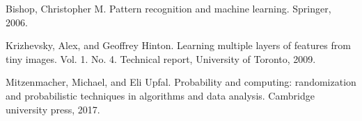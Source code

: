 \documentclass[12pt]{article}
\begin{document}
\begin{thebibliography}{1}
    Bishop, Christopher M. Pattern recognition and machine learning. Springer, 2006.

    Krizhevsky, Alex, and Geoffrey Hinton. Learning multiple layers of features from tiny images. Vol. 1. No. 4. Technical report, University of Toronto, 2009.

    Mitzenmacher, Michael, and Eli Upfal. Probability and computing: randomization and probabilistic techniques in algorithms and data analysis. Cambridge university press, 2017.

\end{thebibliography}
\end{document}
